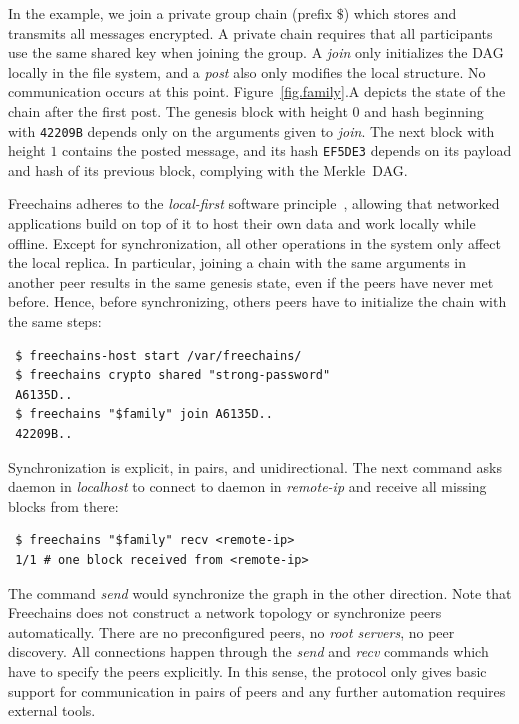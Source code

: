 \documentclass[10pt,journal,compsoc]{IEEEtran}
\newcommand{\FC}   {Freechains\xspace}
\begin{document}
In the example, we join a private group chain (prefix $\$$) which stores and
transmits all messages encrypted.
A private chain requires that all participants use the same shared key when
joining the group.
A \emph{join} only initializes the DAG locally in the file system, and a
\emph{post} also only modifies the local structure.
No communication occurs at this point.
Figure~\ref{fig.family}.A depicts the state of the chain after the first post.
The genesis block with height $0$ and hash beginning with \texttt{42209B}
depends only on the arguments given to \emph{join}.
The next block with height $1$ contains the posted message, and its hash
\texttt{EF5DE3} depends on its payload and hash of its previous block,
complying with the Merkle~DAG.

\FC adheres to the \emph{local-first} software principle~\cite{p2p.local},
allowing that networked applications build on top of it to host their own data
and work locally while offline.
Except for synchronization, all other operations in the system only affect the
local replica.
In particular, joining a chain with the same arguments in another peer results
in the same genesis state, even if the peers have never met before.
Hence, before synchronizing, others peers have to initialize the chain with the
same steps:

{\footnotesize
\begin{verbatim}
 $ freechains-host start /var/freechains/
 $ freechains crypto shared "strong-password"
 A6135D..
 $ freechains "$family" join A6135D..
 42209B..
\end{verbatim}
}

Synchronization is explicit, in pairs, and unidirectional.
The next command asks daemon in \emph{localhost} to connect to daemon in
\emph{remote-ip} and receive all missing blocks from there:

{\footnotesize
\begin{verbatim}
 $ freechains "$family" recv <remote-ip>
 1/1 # one block received from <remote-ip>
\end{verbatim}
}

The command \emph{send} would synchronize the graph in the other direction.
Note that \FC does not construct a network topology or synchronize peers
automatically.
There are no preconfigured peers, no \emph{root servers}, no peer discovery.
All connections happen through the \emph{send} and \emph{recv} commands which
have to specify the peers explicitly.
In this sense, the protocol only gives basic support for communication in pairs
of peers and any further automation requires external tools.
\end{document}
